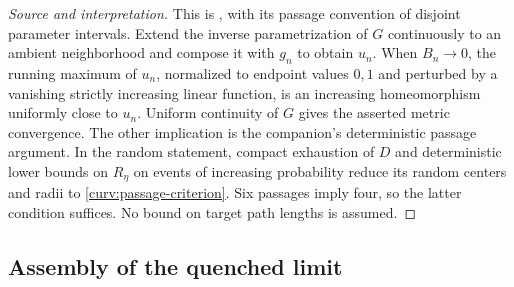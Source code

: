\begin{proof}[Source and interpretation]
This is \cite[Section~7, Lemma ``Progress coordinates and the full
curve metric'']{S}, with its passage convention of disjoint parameter
intervals.  Extend the inverse parametrization of $G$ continuously to
an ambient neighborhood and compose it with $g_n$ to obtain $u_n$.
When $B_n\to0$, the running maximum of $u_n$, normalized to endpoint
values $0,1$ and perturbed by a vanishing strictly increasing linear
function, is an increasing homeomorphism uniformly close to $u_n$.
Uniform continuity of $G$ gives the asserted metric convergence.
The other implication is the companion's deterministic passage
argument.  In the random statement, compact exhaustion of $D$ and
deterministic lower bounds on $R_\eta$ on events of increasing
probability reduce its random centers and radii to
\eqref{curv:passage-criterion}.  Six passages imply four, so the latter
condition suffices.  No bound on target path lengths is assumed.
\end{proof}

\subsection{Assembly of the quenched limit}

